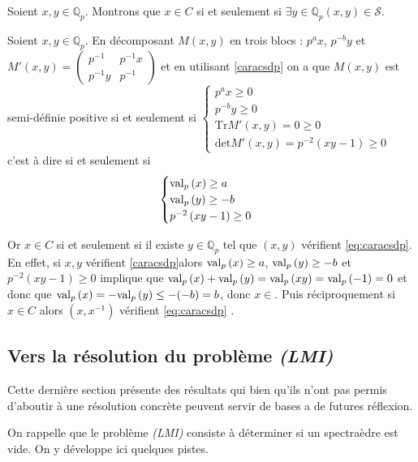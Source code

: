 Soient $x,y \in \mathbb{Q}_{p} $. Montrons que $x \in C$ si et seulement si  $\exists y \in \mathbb{Q}_{p} \left( x,y \right) \in \mathcal{S}$.

Soient $x,y \in \mathbb{Q}_{p} $.
En décomposant $M(x,y)$ en trois blocs : $p^ax$, $p^{-b}y $ et $M'(x,y) = \begin{pmatrix} p^{-1} & p^{-1}x \\ p^{-1} y & p^{-1}\end{pmatrix} $ et en utilisant \ref{caracsdp} on a que $M(x,y)$ est semi-définie positive si et seulement si 
$
\begin{cases}
p^ax \ge 0 \\
p^{-b}y \ge 0\\
\text{Tr}M'\left( x,y \right) = 0 \ge 0\\
\text{det} M'(x,y ) = p^{-2}\left( xy-1 \right)  \ge 0 
\end{cases}
$ 
c'est à dire si et seulement si 
\begin{equation}
\label{eq:caracsdp} 
\begin{cases} 
	\text{val}_p\left(x\right)\ge a\\
\text{val}_p\left(y\right)\ge -b\\
p^{-2} \left( xy-1 \right) \ge 0
\end{cases}
\end{equation}



Or $x \in C$ si et seulement si il existe $y \in \mathbb{Q}_{p} $ tel que $(x, y)$ vérifient \ref{eq:caracsdp}. En effet, si $x, y$ vérifient \ref{caracsdp}alors $\text{val}_p\left(x\right)\ge a$, $\text{val}_p\left(y\right)\ge -b$ et $p^{-2} \left( xy-1 \right) \ge 0$ implique que $\text{val}_p\left(x\right)+\text{val}_p\left(y\right)=\text{val}_p\left(xy\right) = \text{val}_p\left(-1\right) =0$ et donc que $\text{val}_p\left(x\right)=-\text{val}_p\left(y\right)\le -(-b)  =b$, donc $x \in $. Puis réciproquement si $x \in C$ alors $(x,x^{-1}) $ vérifient \ref{eq:caracsdp}  .


\subsection{Vers la résolution du problème \texorpdfstring{ \textit{(LMI)} }{LMI}} 
\label{piste} 
Cette dernière section présente des résultats qui bien qu'ils n'ont pas permis d'aboutir à une résolution concrète peuvent servir de bases a de futures réflexion.

On rappelle que le problème \textit{(LMI)} consiste à déterminer si un spectraèdre est vide. On y développe ici quelques pistes.

